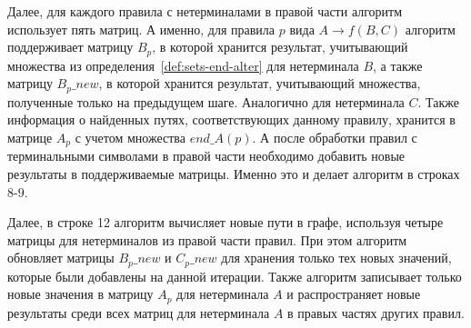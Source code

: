 \begin{algorithm}[H]
	\footnotesize





\end{algorithm}

Далее, для каждого правила с нетерминалами в правой части алгоритм использует пять матриц. А именно, для правила $p$ вида $A \rightarrow f(B, C)$ алгоритм поддерживает матрицу $B_p$, в которой хранится результат, учитывающий множества из определения~\ref{def:sets-end-alter} для нетерминала $B$, а также матрицу $B_p\_new$, в которой хранится результат, учитывающий множества, полученные только на предыдущем шаге. Аналогично для нетерминала $C$. Также информация о найденных путях, соответствующих данному правилу, хранится в матрице $A_p$ с учетом множества $end\_A(p)$. А после обработки правил с терминальными символами в правой части необходимо добавить новые результаты в поддерживаемые матрицы. Именно это и делает алгоритм в строках 8-9.

Далее, в строке 12 алгоритм вычисляет новые пути в графе, используя четыре матрицы для нетерминалов из правой части правил. При этом алгоритм обновляет матрицы $B_p\_new$ и $C_p\_new$ для хранения только тех новых значений, которые были добавлены на данной итерации. Также алгоритм записывает только новые значения в матрицу $A_p$ для нетерминала $A$ и распространяет новые результаты среди всех матриц для нетерминала $A$ в правых частях других правил.

